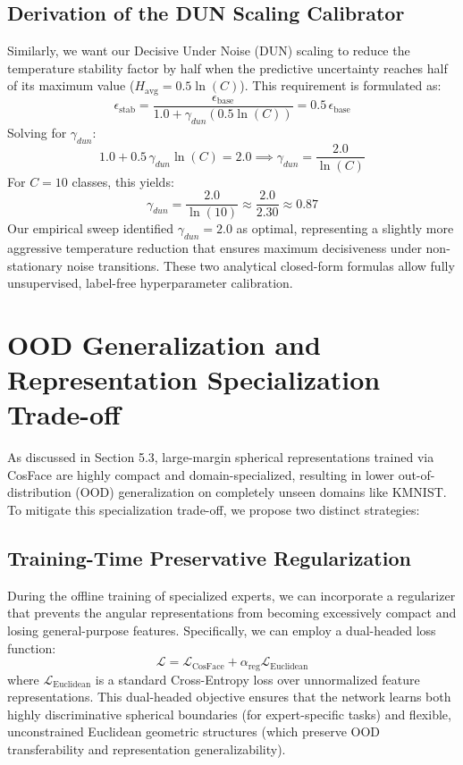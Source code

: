 \documentclass{article}
\theoremstyle{plain}
\theoremstyle{definition}
\theoremstyle{remark}
\begin{document}
\subsection{Derivation of the DUN Scaling Calibrator}
Similarly, we want our Decisive Under Noise (DUN) scaling to reduce the temperature stability factor by half when the predictive uncertainty reaches half of its maximum value ($H_{\text{avg}} = 0.5 \ln(C)$).
This requirement is formulated as:
\begin{equation}
    \epsilon_{\text{stab}} = \frac{\epsilon_{\text{base}}}{1.0 + \gamma_{dun} (0.5 \ln(C))} = 0.5 \, \epsilon_{\text{base}}
\end{equation}
Solving for $\gamma_{dun}$:
\begin{equation}
    1.0 + 0.5 \, \gamma_{dun} \ln(C) = 2.0 \implies \gamma_{dun} = \frac{2.0}{\ln(C)}
\end{equation}
For $C = 10$ classes, this yields:
\begin{equation}
    \gamma_{dun} = \frac{2.0}{\ln(10)} \approx \frac{2.0}{2.30} \approx 0.87
\end{equation}
Our empirical sweep identified $\gamma_{dun} = 2.0$ as optimal, representing a slightly more aggressive temperature reduction that ensures maximum decisiveness under non-stationary noise transitions. These two analytical closed-form formulas allow fully unsupervised, label-free hyperparameter calibration.

\section{OOD Generalization and Representation Specialization Trade-off}
\label{app:ood_tradeoff}

As discussed in Section 5.3, large-margin spherical representations trained via CosFace are highly compact and domain-specialized, resulting in lower out-of-distribution (OOD) generalization on completely unseen domains like KMNIST. To mitigate this specialization trade-off, we propose two distinct strategies:

\subsection{Training-Time Preservative Regularization}
During the offline training of specialized experts, we can incorporate a regularizer that prevents the angular representations from becoming excessively compact and losing general-purpose features. Specifically, we can employ a dual-headed loss function:
\begin{equation}
    \mathcal{L} = \mathcal{L}_{\text{CosFace}} + \alpha_{\text{reg}} \mathcal{L}_{\text{Euclidean}}
\end{equation}
where $\mathcal{L}_{\text{Euclidean}}$ is a standard Cross-Entropy loss over unnormalized feature representations. This dual-headed objective ensures that the network learns both highly discriminative spherical boundaries (for expert-specific tasks) and flexible, unconstrained Euclidean geometric structures (which preserve OOD transferability and representation generalizability).
\end{document}
